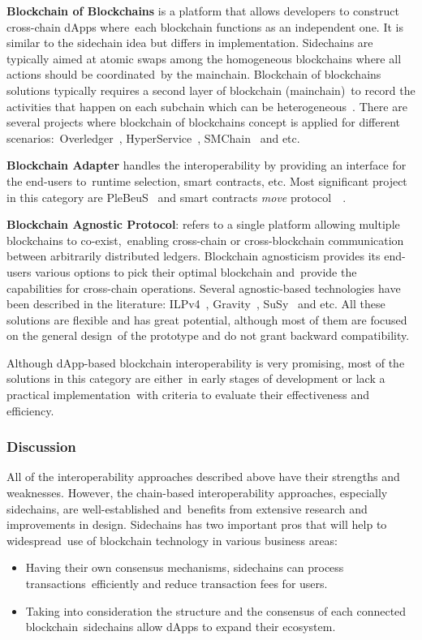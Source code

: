 \textbf{Blockchain of Blockchains} is a platform that allows developers to construct cross-chain dApps where\
each blockchain functions as an independent one.
It is similar to the sidechain idea but differs in implementation.
Sidechains are typically aimed at atomic swaps among the homogeneous blockchains where all actions should be coordinated\
by the mainchain.
Blockchain of blockchains solutions typically requires a second layer of blockchain (mainchain)\
to record the activities that happen on each subchain which can be heterogeneous~\cite{cryptoeprint:2021/537}.
There are several projects where blockchain of blockchains concept is applied for different scenarios:\
Overledger~\cite{Verdian2018}, HyperService~\cite{Liu2019}, SMChain~\cite{cryptoeprint:2019/1401} and etc.

\textbf{Blockchain Adapter} handles the interoperability by providing an interface for the end-users to\
runtime selection, smart contracts, etc.
Most significant project in this category are PleBeuS~\cite{Scheid2020} and smart contracts \emph{move} protocol\
~\cite{Fynn2020}.

\textbf{Blockchain Agnostic Protocol}: refers to a single platform allowing multiple blockchains to co-exist,\
enabling cross-chain or cross-blockchain communication between arbitrarily distributed ledgers.
Blockchain agnosticism provides its end-users various options to pick their optimal blockchain and\
provide the capabilities for cross-chain operations.
Several agnostic-based technologies have been described in the literature: ILPv4~\cite{InterledgerV4},
Gravity~\cite{PupyshevGravity2020}, SuSy~\cite{PupyshevSuSy2020} and etc.
All these solutions are flexible and has great potential, although most of them are focused on the general design\
of the prototype and do not grant backward compatibility.

Although dApp-based blockchain interoperability is very promising, most of the solutions in this category are either\
in early stages of development or lack a practical implementation\
with criteria to evaluate their effectiveness and efficiency.

\subsubsection{Discussion}

All of the interoperability approaches described above have their strengths and weaknesses.
However, the chain-based interoperability approaches, especially sidechains, are well-established and\
benefits from extensive research and improvements in design.
Sidechains has two important pros that will help to widespread\
use of blockchain technology in various business areas:
\begin{itemize}
    \item Having their own consensus mechanisms, sidechains can process transactions\
    efficiently and reduce transaction fees for users.
    \item Taking into consideration the structure and the consensus of each connected blockchain\
    sidechains allow dApps to expand their ecosystem.
\end{itemize}

